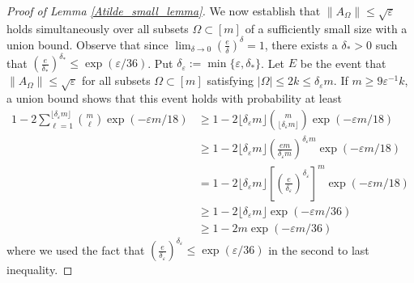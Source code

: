 \documentclass[11pt]{article}
\renewcommand{\epsilon}{\varepsilon}
\theoremstyle{remark}
\begin{document}
\begin{proof}[Proof of Lemma \ref{Atilde_small_lemma}]
We now establish that $\|A_{\Omega}\| \leqslant \sqrt{\epsilon}$ holds simultaneously over all subsets $\Omega \subset [m]$ of a sufficiently small size with a union bound. Observe that since $\lim_{\delta \rightarrow 0} \left(\frac{e}{\delta}\right)^{\delta} = 1$, there exists a $\delta_* > 0$ such that $\left(\frac{e}{\delta_*}\right)^{\delta_{*}} \leqslant \exp(\epsilon /36)$. Put $\delta_{\epsilon} := \min\{\epsilon, \delta_{*}\}$. Let $E$ be the event that $\|A_{\Omega}\| \leqslant \sqrt{\epsilon}$ for all subsets $\Omega \subset [m]$ satisfying $|\Omega| \leqslant 2k \leqslant \delta_{\epsilon} m$. If $m \geqslant 9\epsilon^{-1}k$, a union bound shows that this event holds with probability at least \begin{align*}
    1 - 2 \sum_{\ell = 1}^{\lfloor\delta_{\epsilon} m\rfloor}\binom{m}{\ell}\exp(-\epsilon m/18) & \geqslant 1 - 2\lfloor\delta_{\epsilon} m\rfloor \binom{m}{\lfloor\delta_{\epsilon} m\rfloor}\exp(-\epsilon m/18) \\
    & \geqslant 1 - 2\lfloor\delta_{\epsilon}m\rfloor \left(\frac{em}{\delta_{\epsilon} m}\right)^{\delta_{\epsilon}m}\exp(-\epsilon m/18) \\
    &=  1 - 2  \lfloor\delta_{\epsilon}m\rfloor\left[\left(\frac{e}{\delta_{\epsilon}}\right)^{\delta_{\epsilon}}\right]^m\exp(-\epsilon m/18) \\
    & \geqslant 1 - 2\lfloor\delta_{\epsilon} m\rfloor \exp(-\epsilon m/36) \\
    & \geqslant 1 - 2m\exp(-\epsilon m/36)
\end{align*} where we used the fact that $\left(\frac{e}{\delta_{\epsilon}}\right)^{\delta_{\epsilon}} \leqslant \exp(\epsilon /36)$ in the second to last inequality.


\end{proof}
\end{document}
